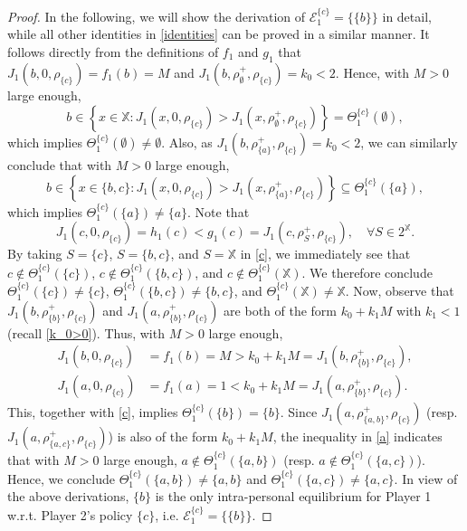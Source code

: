 \documentclass[11pt,reqno]{article}
\numberwithin{equation}{section}
\newcommand{\cE}{\mathcal{E}}
\newcommand{\X}{\mathbb{X}}
\begin{document}
\begin{proof}
In the following, we will show the derivation of $\cE_1^{\{c\}} = \{\{b\}\}$ in detail, while all other identities in \eqref{identities} can be proved in a similar manner. 
It follows directly from the definitions of $f_1$ and $g_1$ that $J_1(b,0,\rho_{\{c\}}) = f_1(b) =M$ and $J_1(b,\rho^+_\emptyset,\rho_{\{c\}})= k_0<2$. Hence, with $M>0$ large enough,
\[
b\in \left\{x\in\X: J_1(x,0,\rho_{\{c\}})> J_1(x,\rho^+_\emptyset,\rho_{\{c\}})\right\}= \Theta_1^{\{c\}}(\emptyset),
\]
which implies $\Theta_1^{\{c\}}(\emptyset)\neq \emptyset$. Also, as $J_1(b,\rho^+_{\{a\}},\rho_{\{c\}})=k_0<2$, we can similarly conclude that with $M>0$ large enough,
\[
b\in \left\{x\in\{b,c\}: J_1(x,0,\rho_{\{c\}})> J_1(x,\rho^+_{\{a\}},\rho_{\{c\}})\right\}\subseteq  \Theta_1^{\{c\}}(\{a\}),
\]
which implies $\Theta_1^{\{c\}}(\{a\})\neq \{a\}$. Note that
\begin{equation}\label{c}
J_1(c,0,\rho_{\{c\}}) = h_1(c)< g_1(c) = J_1(c,\rho^+_S,\rho_{\{c\}}),\quad \forall S\in 2^\X.
\end{equation}
By taking $S=\{c\}$, $S=\{b,c\}$, and $S=\X$ in \eqref{c}, we immediately see that $c\notin \Theta^{\{c\}}_1(\{c\})$, $c\notin \Theta^{\{c\}}_1(\{b,c\})$, and $c\notin \Theta^{\{c\}}_1(\X)$. We therefore conclude $\Theta^{\{c\}}_1(\{c\})\neq\{c\}$, $\Theta^{\{c\}}_1(\{b,c\})\neq\{b,c\}$, and $\Theta^{\{c\}}_1(\X)\neq\X$. Now, observe that $J_1(b, \rho^+_{\{b\}},\rho_{\{c\}})$ and $J_1(a, \rho^+_{\{b\}},\rho_{\{c\}})$ are both of the form $k_0+k_1 M$ with $k_1<1$ (recall \eqref{k_0>0}). Thus, with $M>0$ large enough,
\begin{align}
J_1(b,0,\rho_{\{c\}}) &= f_1(b)= M > k_0+k_1 M = J_1(b, \rho^+_{\{b\}},\rho_{\{c\}}),\\
J_1(a,0,\rho_{\{c\}}) &= f_1(a)=1< k_0+k_1 M = J_1(a, \rho^+_{\{b\}},\rho_{\{c\}}).\label{a}
\end{align}
This, together with \eqref{c}, implies $\Theta^{\{c\}}_1(\{b\})=\{b\}$. Since $J_1(a,\rho^+_{\{a,b\}},\rho_{\{c\}})$ (resp. $J_1(a,\rho^+_{\{a,c\}},\rho_{\{c\}})$) is also of the form $k_0+k_1 M$, the inequality in \eqref{a} indicates that with $M>0$ large enough, $a\notin \Theta^{\{c\}}_1(\{a,b\})$ (resp. $a\notin \Theta^{\{c\}}_1(\{a,c\})$). Hence, we conclude $\Theta^{\{c\}}_1(\{a,b\})\neq\{a,b\}$ and $\Theta^{\{c\}}_1(\{a,c\})\neq\{a,c\}$. In view of the above derivations, $\{b\}$ is the only intra-personal equilibrium for Player 1 w.r.t. Player 2's policy $\{c\}$, i.e. $\cE_1^{\{c\}}=\{\{b\}\}$. 

\end{proof}
\end{document}
